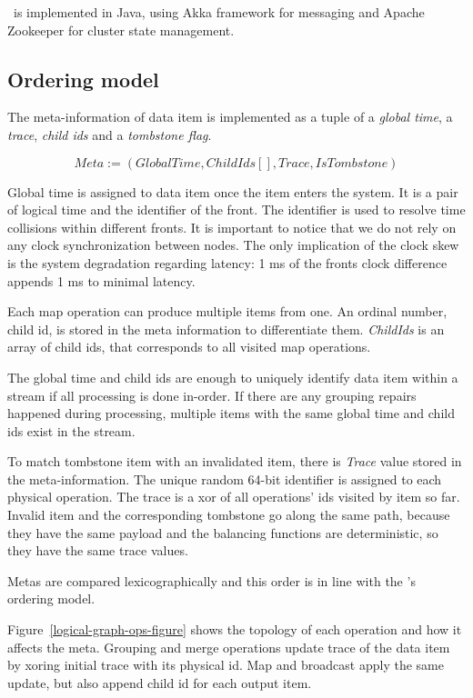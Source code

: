 \label{fs-impl}

\FlameStream\ is implemented in Java, using Akka framework for messaging and Apache Zookeeper for cluster state management.

\subsection{Ordering model}
The meta-information of data item is implemented as a tuple of a {\it global time}, a {\it trace}, {\it child ids} and a {\it tombstone flag}.

\[Meta := (GlobalTime, ChildIds[], Trace, IsTombstone)\]

Global time is assigned to data item once the item enters the system. It is a pair of logical time and the identifier of the front. The identifier is used to resolve time collisions within different fronts. It is important to notice that we do not rely on any clock synchronization between nodes. The only implication of the clock skew is the system degradation regarding latency: 1 ms of the fronts clock difference appends 1 ms to minimal latency.

Each map operation can produce multiple items from one.  An ordinal number, child id, is stored in the meta information to differentiate them. {\it ChildIds} is an array of child ids, that corresponds to all visited map operations.

The global time and child ids are enough to uniquely identify data item within a stream if all processing is done in-order. If there are any grouping repairs happened during processing, multiple items with the same global time and child ids exist in the stream. 

To match tombstone item with an invalidated item, there is {\it Trace} value stored in the meta-information. The unique random 64-bit identifier is assigned to each physical operation. The trace is a xor of all operations' ids visited by item so far. Invalid item and the corresponding tombstone go along the same path, because they have the same payload and the balancing functions are deterministic, so they have the same trace values.

Metas are compared lexicographically and this order is in line with the \FlameStream's ordering model.

Figure~\ref{logical-graph-ops-figure} shows the topology of each operation and how it affects the meta. Grouping and merge operations update trace of the data item by xoring initial trace with its physical id. Map and broadcast apply the same update, but also append child id for each output item.

